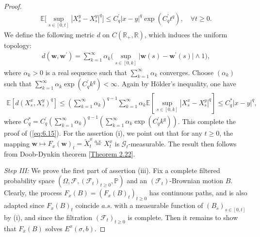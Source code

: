 \documentclass{article}
\numberwithin{equation}{section}
\newcommand{\E}{\mathbb{E}}
\newcommand{\bfw}{\mathbf{w}}
\renewcommand{\P}{\mathbb{P}}
\theoremstyle{plain}
\theoremstyle{definition}
\begin{document}
\begin{proof}
\begin{align*}
	\E\biggl[\sup_{s\in[0,t]}\left\vert X_s^y-X_s^y\right\vert^q\biggr]\leq C_q^\prime\vert x-y\vert^q\exp\left(C_q^\prime t^q\right),\quad\forall t\geq 0.
\end{align*}
We define the following metric $d$ on $C(\mathbb{R}_+,\mathbb{R})$, which induces the uniform topology:
\begin{align*}
	d(\bfw,\bfw^\prime) = \sum_{k=1}^\infty\alpha_k\biggl(\sup_{s\in[0,k]}\vert\bfw(s)-\bfw^\prime(s)\vert\wedge 1\biggr),
\end{align*}
where $\alpha_k>0$ is a real sequence such that $\sum_{k=1}^\infty\alpha_k$ converges. Choose $(\alpha_k)$ such that $\sum_{k=1}^\infty\alpha_k\exp(C_q^\prime k^q)<\infty$. Again by Hölder's inequality, one have
\begin{align*}
	\E\left[d(X_s^x,X_s^y)^q\right]\leq\left(\sum_{k=1}^\infty\alpha_k\right)^{q-1}\sum_{k=1}^\infty\alpha_k\E\left[\sup_{s\in[0,k]}\left\vert X_s^x-X_s^y\right\vert^q\right]\leq C_q^*\vert x-y\vert^q,
\end{align*}
where $C_q^*=C_q^\prime\left(\sum_{k=1}^\infty\alpha_k\right)^{q-1}\left(\sum_{k=1}^\infty\alpha_k\exp(C_q^\prime k^q)\right)$. This complete the proof of (\ref{eq:6.15}). For the assertion (i), we point out that for any $t\geq 0$, the mapping $\bfw\mapsto F_x(\bfw)_t=\widetilde{X}_t^x\overset{a.s.}{=}X_t^x$ is $\mathscr{G}_t$-measurable. The result then follows from Doob-Dynkin theorem [\hyperref[thm:2.22]{Theorem 2.22}].
\vspace{0.1cm}

\textit{Step III:} We prove the first part of assertion (iii). Fix a complete filtered probability space $(\Omega,\mathscr{F},(\mathscr{F}_t)_{t\geq 0},\P)$ and an $(\mathscr{F}_t)$-Brownian motion $B$. Clearly, the process $F_x(B)=(F_x(B)_t)_{t\geq 0}$ has continuous paths, and is also adapted since $F_x(B)_t$ coincide $a.s.$ with a measurable function of $(B_s)_{s\in[0,t]}$ by (i), and since the filtration $(\mathscr{F}_t)_{t\geq 0}$ is complete. Then it remains to show that $F_x(B)$ solves $E^x(\sigma,b)$.


\end{proof}
\end{document}
